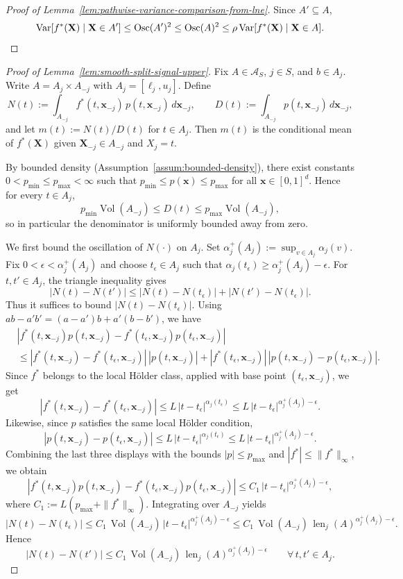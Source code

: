 \documentclass[11pt]{article}
\theoremstyle{plain}
\theoremstyle{definition}
\theoremstyle{remark}
\theoremstyle{plain}
\newcommand{\bx}{\mathbf{x}}
\newcommand{\bX}{\mathbf{X}}
\newcommand{\Var}{\textnormal{Var}}
\DeclareMathOperator{\Vol}{Vol}
\DeclareMathOperator{\len}{len}
\newcommand{\1}{\mathbbm{1}}
\newcommand{\Osc}{\operatorname{Osc}}
\begin{document}
\begin{proof}[Proof of Lemma~\ref{lem:pathwise-variance-comparison-from-lne}]
Since $A'\subseteq A$,
\[
\Var[f^*(\bX)\mid\bX\in A']
\le
\Osc(A')^2
\le
\Osc(A)^2
\le
\rho\,\Var[f^*(\bX)\mid\bX\in A].
\]
\end{proof}

\begin{proof}[Proof of Lemma~\ref{lem:smooth-split-signal-upper}]
Fix $A\in\mathcal A_S$, $j\in S$, and $b\in A_j$. Write $A=A_j\times A_{-j}$ with $A_j=[\ell_j,u_j]$. Define
\[
N(t):=\int_{A_{-j}} f^*(t,\bx_{-j})\,p(t,\bx_{-j})\,d\bx_{-j},
\qquad
D(t):=\int_{A_{-j}} p(t,\bx_{-j})\,d\bx_{-j},
\]
and let $m(t):=N(t)/D(t)$ for $t\in A_j$. Then $m(t)$ is the conditional mean of $f^*(\bX)$ given $\bX_{-j}\in A_{-j}$ and $X_j=t$.

By bounded density (Assumption~\ref{assum:bounded-density}), there exist constants $0<p_{\min}\le p_{\max}<\infty$ such that $p_{\min}\le p(\bx)\le p_{\max}$ for all $\bx\in[0,1]^d$. Hence for every $t\in A_j$,
\[
p_{\min}\Vol(A_{-j})
\le
D(t)
\le
p_{\max}\Vol(A_{-j}),
\]
so in particular the denominator is uniformly bounded away from zero.

We first bound the oscillation of $N(\cdot)$ on $A_j$. Set
$\alpha_j^+(A_j):=\sup_{v\in A_j}\alpha_j(v)$. Fix
$0<\epsilon<\alpha_j^+(A_j)$ and
choose $t_\epsilon\in A_j$ such that
$\alpha_j(t_\epsilon)\ge\alpha_j^+(A_j)-\epsilon$. For $t,t'\in A_j$,
the triangle inequality gives
\[
|N(t)-N(t')|
\le
|N(t)-N(t_\epsilon)|+|N(t')-N(t_\epsilon)|.
\]
Thus it suffices to bound $|N(t)-N(t_\epsilon)|$. Using
$ab-a'b'=(a-a')b+a'(b-b')$, we have
\begin{align*}
&|f^*(t,\bx_{-j})p(t,\bx_{-j})-f^*(t_\epsilon,\bx_{-j})p(t_\epsilon,\bx_{-j})|\\
&\le
|f^*(t,\bx_{-j})-f^*(t_\epsilon,\bx_{-j})|\,|p(t,\bx_{-j})|
+
|f^*(t_\epsilon,\bx_{-j})|\,|p(t,\bx_{-j})-p(t_\epsilon,\bx_{-j})|.
\end{align*}
Since $f^*$ belongs to the local H\"{o}lder class, applied with base
point $(t_\epsilon,\bx_{-j})$, we get
\[
|f^*(t,\bx_{-j})-f^*(t_\epsilon,\bx_{-j})|
\le
L\,|t-t_\epsilon|^{\alpha_j(t_\epsilon)}
\le
L\,|t-t_\epsilon|^{\alpha_j^+(A_j)-\epsilon}.
\]
Likewise, since $p$ satisfies the same local H\"{o}lder condition,
\[
|p(t,\bx_{-j})-p(t_\epsilon,\bx_{-j})|
\le
L\,|t-t_\epsilon|^{\alpha_j(t_\epsilon)}
\le
L\,|t-t_\epsilon|^{\alpha_j^+(A_j)-\epsilon}.
\]
Combining the last three displays with the bounds $|p|\le p_{\max}$ and $|f^*|\le \|f^*\|_\infty$, we obtain
\[
|f^*(t,\bx_{-j})p(t,\bx_{-j})-f^*(t_\epsilon,\bx_{-j})p(t_\epsilon,\bx_{-j})|
\le
C_1\,|t-t_\epsilon|^{\alpha_j^+(A_j)-\epsilon},
\]
where $C_1:=L(p_{\max}+\|f^*\|_{\infty})$. Integrating over $A_{-j}$ yields
\[
|N(t)-N(t_\epsilon)|
\le
C_1\,\Vol(A_{-j})\,|t-t_\epsilon|^{\alpha_j^+(A_j)-\epsilon}
\le
C_1\,\Vol(A_{-j})\,\len_j(A)^{\alpha_j^+(A_j)-\epsilon}.
\]
Hence
\[
|N(t)-N(t')|
\le
C_1\,\Vol(A_{-j})\,\len_j(A)^{\alpha_j^+(A_j)-\epsilon}
\qquad \forall\, t,t'\in A_j.
\]


\end{proof}
\end{document}
